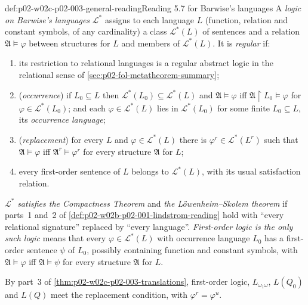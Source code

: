\begin{hbconvention}{def:p02-w02c-p02-003-general-reading}{Reading 5.7 for Barwise's languages}
A \emph{logic on Barwise's languages} \(\mathcal L^{\ast}\) assigns to each
language \(L\) (function, relation and constant symbols, of any
cardinality) a class \(\mathcal L^{\ast}(L)\) of sentences and a relation
\(\mathfrak A\models\varphi\) between structures for \(L\) and members of
\(\mathcal L^{\ast}(L)\).  It is \emph{regular} if:
\begin{enumerate}
\item its restriction to relational languages is a regular abstract logic
      in the relational sense of \cref{sec:p02-fol-metatheorem-summary};
\item (\emph{occurrence}) if \(L_0\subseteq L\) then
      \(\mathcal L^{\ast}(L_0)\subseteq\mathcal L^{\ast}(L)\) and
      \(\mathfrak A\models\varphi\) iff
      \(\mathfrak A\restriction L_0\models\varphi\) for
      \(\varphi\in\mathcal L^{\ast}(L_0)\); and each
      \(\varphi\in\mathcal L^{\ast}(L)\) lies in
      \(\mathcal L^{\ast}(L_0)\) for some finite \(L_0\subseteq L\), its
      \emph{occurrence language};
\item (\emph{replacement}) for every \(L\) and
      \(\varphi\in\mathcal L^{\ast}(L)\) there is
      \(\varphi^{r}\in\mathcal L^{\ast}(L^{r})\) such that
      \(\mathfrak A\models\varphi\) iff \(\mathfrak A^{r}\models\varphi^{r}\)
      for every structure \(\mathfrak A\) for \(L\);
\item every first-order sentence of \(L\) belongs to
      \(\mathcal L^{\ast}(L)\), with its usual satisfaction relation.
\end{enumerate}
\(\mathcal L^{\ast}\) \emph{satisfies the Compactness Theorem} and
\emph{the L\"owenheim--Skolem theorem} if parts~1 and~2 of
\cref{def:p02-w02b-p02-001-lindstrom-reading} hold with ``every relational
signature'' replaced by ``every language''.  \emph{First-order logic is
the only such logic} means that every \(\varphi\in\mathcal L^{\ast}(L)\)
with occurrence language \(L_0\) has a first-order sentence \(\psi\) of
\(L_0\), possibly containing function and constant symbols, with
\(\mathfrak A\models\varphi\) iff \(\mathfrak A\models\psi\) for every
structure \(\mathfrak A\) for \(L\).
\end{hbconvention}

By part~3 of \cref{thm:p02-w02c-p02-003-translations}, first-order logic,
\(L_{\omega_1\omega}\), \(L(Q_0)\) and \(L(Q)\) meet the replacement
condition, with \(\varphi^{r}=\varphi^{u}\).

